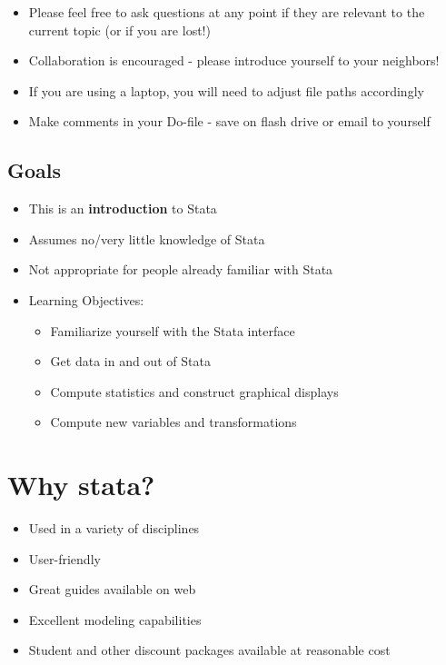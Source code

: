 \documentclass[]{book}
\providecommand{\tightlist}{%
  \setlength{\itemsep}{0pt}\setlength{\parskip}{0pt}}
\begin{document}
\begin{itemize}
\tightlist
\item
  Please feel free to ask questions at any point if they are relevant to the current topic (or if you are lost!)
\item
  Collaboration is encouraged - please introduce yourself to your neighbors!
\item
  If you are using a laptop, you will need to adjust file paths accordingly
\item
  Make comments in your Do-file - save on flash drive or email to yourself
\end{itemize}

\hypertarget{goals-5}{%
\subsection{Goals}\label{goals-5}}

\begin{itemize}
\tightlist
\item
  This is an \textbf{introduction} to Stata
\item
  Assumes no/very little knowledge of Stata
\item
  Not appropriate for people already familiar with Stata
\item
  Learning Objectives:

  \begin{itemize}
  \tightlist
  \item
    Familiarize yourself with the Stata interface
  \item
    Get data in and out of Stata
  \item
    Compute statistics and construct graphical displays
  \item
    Compute new variables and transformations
  \end{itemize}
\end{itemize}

\hypertarget{why-stata}{%
\section{Why stata?}\label{why-stata}}

\begin{itemize}
\tightlist
\item
  Used in a variety of disciplines
\item
  User-friendly
\item
  Great guides available on web
\item
  Excellent modeling capabilities
\item
  Student and other discount packages available at reasonable cost
\end{itemize}
\end{document}
